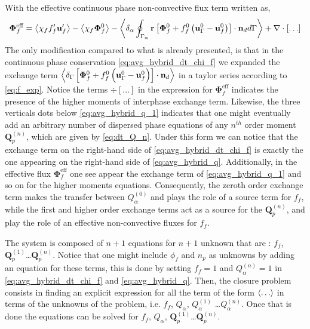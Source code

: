 With the effective continuous phase non-convective flux term written as, 
\begin{align*}
    \mathbf{\Phi}_f^\text{eff}
    = \left<\chi_f f_f' \textbf{u}_f'\right>
    - \left<\chi_f \bm\Phi_f^0\right>
    - \left<\delta_\alpha \oint_{\Gamma_{\alpha}} \textbf{r}\left[
        \mathbf{\Phi}_f^0
        + f_f^0
        \left(
            \textbf{u}_\Gamma^0
            - \textbf{u}_f^0
        \right)
    \right]
    \cdot \textbf{n}_d d\Gamma\right>
    + \mathbf{\nabla}\cdot[\ldots]
\end{align*}
The only modification compared to what is already presented, is that in the continuous phase conservation \eqref{eq:avg_hybrid_dt_chi_f} we expanded the exchange term $\left<\delta_\Gamma \left[
    \mathbf{\Phi}_f^0
    + f_f^0
    \left(
        \textbf{u}_\Gamma ^0
        - \textbf{u}_f^0
    \right)
\right]
\cdot \textbf{n}_d\right>$ in a taylor series according to \ref{eq:f_exp}. 
Notice the terms $\div[\ldots]$ in the expression for  $\mathbf{\Phi}_f^\text{eff}$ indicates the presence of the higher moments of interphase exchange term. 
Likewise, the three verticals dots below \ref{eq:avg_hybrid_q_1} indicates that one might eventually add an arbitrary number of dispersed phase equations of any $n^{th}$ order moment $\textbf{Q}_p^{(n)}$, which are given by \ref{eq:dt_Q_n}. 
Under this form we can notice that the exchange term on the right-hand side of \ref{eq:avg_hybrid_dt_chi_f} is exactly the one appearing on the right-hand side of \ref{eq:avg_hybrid_q}. 
Additionally, in the effective flux $\mathbf{\Phi}_f^\text{eff}$ one see appear the exchange term of \ref{eq:avg_hybrid_q_1} and so on for the higher moments equations. 
Consequently, the zeroth order exchange term makes the transfer between $Q_\alpha^{(0)}$ and plays the role of a source term for $f_f$, while the first and higher order exchange terms act as a source for the $\textbf{Q}_p^{(n)}$, and play the role of an effective non-convective fluxes for $f_f$. 


The system is composed of $n+1$ equations for $n+1$ unknown that are : $f_f$, $\textbf{Q}_p^{(1)}$\ldots$\textbf{Q}_p^{(n)}$. 
Notice that one might include $\phi_f$ and $n_p$ as unknowns by adding an equation for these terms, this is done by setting $f_f=1$ and $Q_\alpha^{(n)} =1$ in \ref{eq:avg_hybrid_dt_chi_f} and \ref{eq:avg_hybrid_q}.
Then, the closure problem consists in finding an explicit expression for all the term of the form $\left<\ldots\right>$ in terms of the unknowns of the problem, i.e. 
$f_f$, $Q_\alpha$, $Q_\alpha^{(1)}$ \ldots $Q_\alpha^{(n)}$.  
Once that is done the equations can be solved for $f_f$,  $Q_\alpha$, $\textbf{Q}_p^{(1)}$\ldots$\textbf{Q}_p^{(n)}$. 

